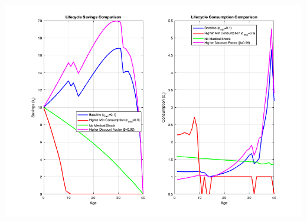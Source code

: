 \documentclass[10pt,a4paper]{article}
\begin{document}
\includegraphics[scale=0.5]{lifecycle_comparison.png}
\end{document}
